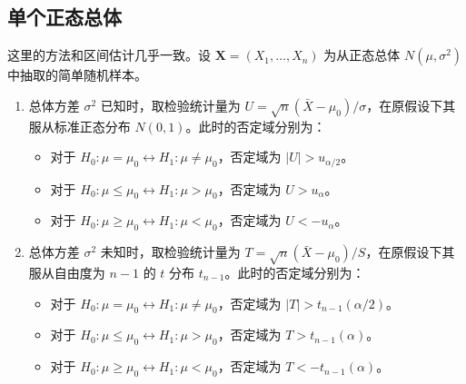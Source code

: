 \subsection{单个正态总体}\label{subsec:单个正态总体}
这里的方法和区间估计几乎一致。设 $\mathbf{X} = (X_1, \dots, X_n)$ 为从正态总体 $N(\mu, \sigma^2)$ 中抽取的简单随机样本。
\begin{proposition}[单个正态总体均值的假设检验]\label{prop:single_normal_mean_hypothesis_test}
    \begin{enumerate}
        \item 总体方差 $\sigma^2$ 已知时，取检验统计量为 $U = \sqrt{n}(\bar{X}-\mu_0)/\sigma$，在原假设下其服从标准正态分布 $N(0,1)$。此时的否定域分别为：
        \begin{itemize}
            \item 对于 $H_0: \mu = \mu_0 \leftrightarrow H_1: \mu \ne \mu_0$，否定域为 $|U| > u_{\alpha/2}$。
            \item 对于 $H_0: \mu \le \mu_0 \leftrightarrow H_1: \mu > \mu_0$，否定域为 $U > u_\alpha$。
            \item 对于 $H_0: \mu \ge \mu_0 \leftrightarrow H_1: \mu < \mu_0$，否定域为 $U < -u_\alpha$。
        \end{itemize}
        \item 总体方差 $\sigma^2$ 未知时，取检验统计量为 $T = \sqrt{n}(\bar{X}-\mu_0)/S$，在原假设下其服从自由度为 $n-1$ 的 $t$ 分布 $t_{n-1}$。此时的否定域分别为：
        \begin{itemize}
            \item 对于 $H_0: \mu = \mu_0 \leftrightarrow H_1: \mu \ne \mu_0$，否定域为 $|T| > t_{n-1}(\alpha/2)$。
            \item 对于 $H_0: \mu \le \mu_0 \leftrightarrow H_1: \mu > \mu_0$，否定域为 $T > t_{n-1}(\alpha)$。
            \item 对于 $H_0: \mu \ge \mu_0 \leftrightarrow H_1: \mu < \mu_0$，否定域为 $T < -t_{n-1}(\alpha)$。
        \end{itemize}
    \end{enumerate}
\end{proposition}

